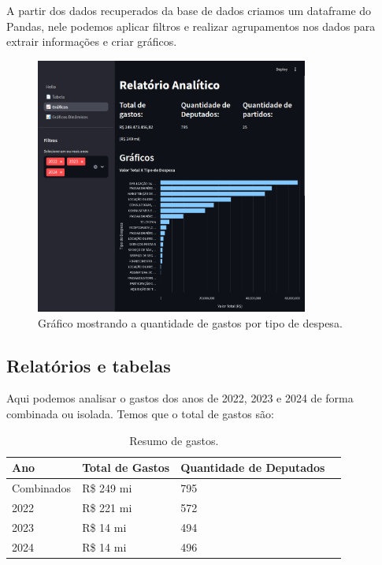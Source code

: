 \documentclass[12pt, a4paper]{article}
\begin{document}
A partir dos dados recuperados da base de dados criamos um dataframe do Pandas\cite{Pandas}, nele podemos aplicar filtros e realizar agrupamentos nos dados para extrair informações e criar gráficos.


\begin{figure}[!htbp]
	\centering
	\includegraphics[width=0.8\textwidth]{assets/2_plot1.png}
	\caption{Gráfico mostrando a quantidade de gastos por tipo de despesa.}
	\label{fig:criacao_postgresql}
\end{figure}

\subsection{Relatórios e tabelas}

Aqui podemos analisar o gastos dos anos de 2022, 2023 e 2024 de forma combinada ou isolada. Temos que o total de gastos são:

\begin{table}[htbp]
	\centering
	\begin{tabular}{llll}
		\toprule
		Ano & Total de Gastos & Quantidade de Deputados \\
		\midrule
		Combinados & R\$ 249 mi & 795 \\
		2022 & R\$ 221 mi & 572 \\
		2023 & R\$ 14 mi & 494 \\
		2024 & R\$ 14 mi & 496 \\
		\bottomrule
	\end{tabular}
	\caption{Resumo de gastos.}
	\label{tab:minhatabela1}
\end{table}
\end{document}
